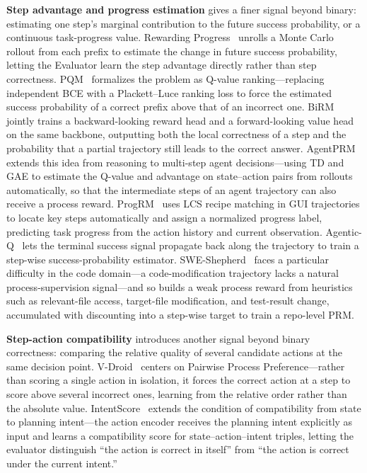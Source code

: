 \textbf{Step advantage and progress estimation} gives a finer signal beyond binary: estimating one step's marginal contribution to the future success probability, or a continuous task-progress value. Rewarding Progress~\cite{Set24} unrolls a Monte Carlo rollout from each prefix to estimate the change in future success probability, letting the Evaluator learn the step advantage directly rather than step correctness. PQM~\cite{Li24m} formalizes the problem as Q-value ranking---replacing independent BCE with a Plackett--Luce ranking loss to force the estimated success probability of a correct prefix above that of an incorrect one. BiRM~\cite{Che25s} jointly trains a backward-looking reward head and a forward-looking value head on the same backbone, outputting both the local correctness of a step and the probability that a partial trajectory still leads to the correct answer. AgentPRM~\cite{Xi25b} extends this idea from reasoning to multi-step agent decisions---using TD and GAE to estimate the Q-value and advantage on state--action pairs from rollouts automatically, so that the intermediate steps of an agent trajectory can also receive a process reward. ProgRM~\cite{Zha25z} uses LCS recipe matching in GUI trajectories to locate key steps automatically and assign a normalized progress label, predicting task progress from the action history and current observation. Agentic-Q~\cite{Wan26s} lets the terminal success signal propagate back along the trajectory to train a step-wise success-probability estimator. SWE-Shepherd~\cite{Dih26} faces a particular difficulty in the code domain---a code-modification trajectory lacks a natural process-supervision signal---and so builds a weak process reward from heuristics such as relevant-file access, target-file modification, and test-result change, accumulated with discounting into a step-wise target to train a repo-level PRM.

\textbf{Step-action compatibility} introduces another signal beyond binary correctness: comparing the relative quality of several candidate actions at the same decision point. V-Droid~\cite{Dai25} centers on Pairwise Process Preference---rather than scoring a single action in isolation, it forces the correct action at a step to score above several incorrect ones, learning from the relative order rather than the absolute value. IntentScore~\cite{Che26s} extends the condition of compatibility from state to planning intent---the action encoder receives the planning intent explicitly as input and learns a compatibility score for state--action--intent triples, letting the evaluator distinguish ``the action is correct in itself'' from ``the action is correct under the current intent.''

